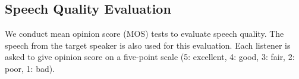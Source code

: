 \documentclass{article}
\begin{document}



%
\subsection{Speech Quality Evaluation}
\label{ssec:subhead}
We conduct  mean opinion score (MOS) tests to evaluate speech quality.  The speech from the target speaker is also used for this evaluation.  Each listener
is asked to give opinion score on a five-point scale (5: excellent, 4: good, 3: fair, 2: poor, 1: bad). 
\end{document}
